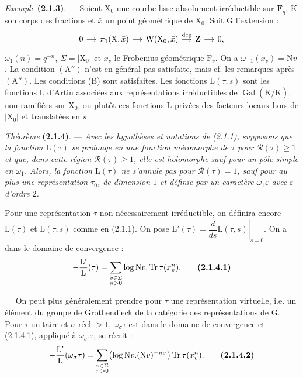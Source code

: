 \documentclass[11pt,leqno]{article}
\newcommand{\Page}[1]{\ifvmode\noindent\else\unskip\ \fi{\footnotesize\textcolor{gray}{[p.\,#1]}}\ \ignorespaces}
\begin{document}
\textit{Exemple} \textbf{(2.1.3)}. — Soient \(\mathrm{X}_0\) une courbe lisse absolument irréductible sur \(\mathbf{F}_q\), \(\mathrm{K}\) son corps des fractions et \(\bar{x}\) un point géométrique de \(\mathrm{X}_0\). Soit \(\mathrm{G}\) l’extension :
\[
\begin{tikzcd}[column sep=1.2em]
0 \arrow[r]
  & \pi_1(\mathrm{X},\bar{x}) \arrow[r]
  & \mathrm{W}(\mathrm{X}_0,\bar{x}) \arrow[r,"\deg"]
  & \mathbf{Z} \arrow[r]
  & 0,
\end{tikzcd}
\]
\(\omega_1(n)=q^{-n}\), \(\Sigma=|\mathrm{X}_0|\) et \(x_v\) le Frobenius géométrique \(\mathrm{F}_v\). On a \(\omega_{-1}(x_v)=\mathrm{N}v\). La condition \((\mathrm{A}'')\) n’est en général pas satisfaite, mais cf. les remarques après \((\mathrm{A}'')\). Les conditions (B) sont satisfaites. Les fonctions \(\mathrm{L}(\tau,s)\) sont les fonctions \(\mathrm{L}\) d’Artin associées aux représentations irréductibles de \(\operatorname{Gal}(\overline{\mathrm{K}}/\mathrm{K})\), non ramifiées sur \(\mathrm{X}_0\), ou plutôt ces fonctions \(\mathrm{L}\) privées des facteurs locaux hors de \(|\mathrm{X}_0|\) et translatées en \(s\).

\textit{Théorème} \textbf{(2.1.4)}. — \textit{Avec les hypothèses et notations de \textup{(2.1.1)}, supposons que la fonction \(\mathrm{L}(\tau)\) se prolonge en une fonction méromorphe de \(\tau\) pour \(\mathscr{R}(\tau)\geq1\) et que, dans cette région \(\mathscr{R}(\tau)\geq1\), elle est holomorphe sauf pour un pôle simple en \(\omega_1\). Alors, la fonction \(\mathrm{L}(\tau)\) ne s’annule pas pour \(\mathscr{R}(\tau)=1\), sauf pour au plus une représentation \(\tau_0\), de dimension \(1\) et définie par un caractère \(\omega_1\varepsilon\) avec \(\varepsilon\) d’ordre \(2\).}

Pour une représentation \(\tau\) non nécessairement irréductible, on définira encore \(\mathrm{L}(\tau)\) et \(\mathrm{L}(\tau,s)\) comme en (2.1.1). On pose \(\mathrm{L}'(\tau)=\left.\dfrac{d}{ds}\mathrm{L}(\tau,s)\right|_{s=0}\). On a dans le domaine de convergence :
\[
-\frac{\mathrm{L}'}{\mathrm{L}}(\tau)
 =\sum_{\substack{v\in\Sigma\\ n>0}}
   \log\mathrm{N}v.\operatorname{Tr}\tau(x_v^n).
\tag*{\textbf{(2.1.4.1)}}
\]

\Page{189}
On peut plus généralement prendre pour \(\tau\) une représentation virtuelle, i.e. un élément du groupe de Grothendieck de la catégorie des représentations de \(\mathrm{G}\). Pour \(\tau\) unitaire et \(\sigma\) réel \(>1\), \(\omega_\sigma\tau\) est dans le domaine de convergence et (2.1.4.1), appliqué à \(\omega_\sigma.\tau\), se récrit :
\[
-\frac{\mathrm{L}'}{\mathrm{L}}(\omega_\sigma\tau)
 =\sum_{\substack{v\in\Sigma\\ n>0}}
   \bigl(\log\mathrm{N}v.(\mathrm{N}v)^{-n\sigma}\bigr)
   \operatorname{Tr}\tau(x_v^n).
\tag*{\textbf{(2.1.4.2)}}
\]
\end{document}
